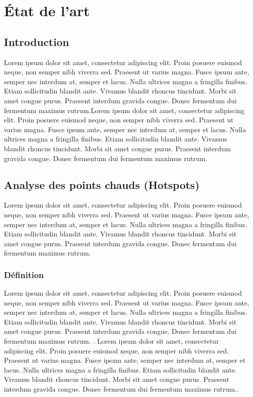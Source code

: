 \chapter{État de l'art}

\clearpage


\section{Introduction}
Lorem ipsum dolor sit amet, consectetur adipiscing elit. Proin posuere euismod neque, non semper nibh viverra sed. Praesent ut varius magna. Fusce ipsum ante, semper nec interdum at, semper et lacus. Nulla ultrices magna a fringilla finibus. Etiam sollicitudin blandit ante. Vivamus blandit rhoncus tincidunt. Morbi sit amet congue purus. Praesent interdum gravida congue. Donec fermentum dui fermentum maximus rutrum.Lorem ipsum dolor sit amet, consectetur adipiscing elit. Proin posuere euismod neque, non semper nibh viverra sed. Praesent ut varius magna. Fusce ipsum ante, semper nec interdum at, semper et lacus. Nulla ultrices magna a fringilla finibus. Etiam sollicitudin blandit ante. Vivamus blandit rhoncus tincidunt. Morbi sit amet congue purus. Praesent interdum gravida congue. Donec fermentum dui fermentum maximus rutrum.


\section{Analyse des points chauds (Hotspots)}
\label{sec:hotspot}
Lorem ipsum dolor sit amet, consectetur adipiscing elit. Proin posuere euismod neque, non semper nibh viverra sed. Praesent ut varius magna. Fusce ipsum ante, semper nec interdum at, semper et lacus. Nulla ultrices magna a fringilla finibus. Etiam sollicitudin blandit ante. Vivamus blandit rhoncus tincidunt. Morbi sit amet congue purus. Praesent interdum gravida congue. Donec fermentum dui fermentum maximus rutrum.

\medskip

\subsection{Définition}
Lorem ipsum dolor sit amet, consectetur adipiscing elit. Proin posuere euismod neque, non semper nibh viverra sed. Praesent ut varius magna. Fusce ipsum ante, semper nec interdum at, semper et lacus. Nulla ultrices magna a fringilla finibus. Etiam sollicitudin blandit ante. Vivamus blandit rhoncus tincidunt. Morbi sit amet congue purus. Praesent interdum gravida congue. Donec fermentum dui fermentum maximus rutrum. \parencite{mennis_spatial_2009}. Lorem ipsum dolor sit amet, consectetur adipiscing elit. Proin posuere euismod neque, non semper nibh viverra sed. Praesent ut varius magna. Fusce ipsum ante, semper nec interdum at, semper et lacus. Nulla ultrices magna a fringilla finibus. Etiam sollicitudin blandit ante. Vivamus blandit rhoncus tincidunt. Morbi sit amet congue purus. Praesent interdum gravida congue. Donec fermentum dui fermentum maximus rutrum.\parencite{shekhar_identifying_2011}.

